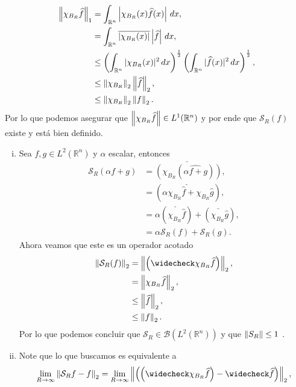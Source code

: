 \begin{homeworkProblem}
\begin{solution}
\begin{note}{}
      \begin{align*}
        \left\|\chi_{B_{R}}\widehat{f}\right\|_{1}&=\int_{\mathbb{R}^{n}}\left| \chi_{B_{R}}(x)\widehat{f}(x) \right|\, dx,\\
        &=\int_{\mathbb{R}^{n}}\overline{\left| \chi_{B_{R}}(x) \right|}\left| \widehat{f} \right|\, dx,\\
        &\leq \left( \int_{\mathbb{R}^{n}}|\chi_{B_{R}}(x)|^2\, dx \right)^{\frac{1}{2}}\left( \int_{\mathbb{R}^{n}}|\widehat{f}(x)|^{2}\, dx \right)^{\frac{1}{2}},\\
        &\leq \left\|\chi_{B_{R}}\right\|_{2}\left\|\widehat{f}\right\|_{2},\\
        &\leq \left\|\chi_{B_{R}}\right\|_{2}\left\|f\right\|_{2}.
      \end{align*}
      Por lo que podemos asegurar que $\left\|\chi_{B_{R}}\widehat{f}\right\|\in L^1(\mathbb{R}^{n})$ y por ende que $\mathcal{S}_{R}(f)$ existe y está bien definido. 
    \end{note}
    \begin{enumerate}[(i)]
      \item Sea $f,g\in L^2(\mathbb{R}^{n})$ y $\alpha$ escalar, entonces
        \begin{align*}
          \mathcal{S}_{R}\left( \alpha f+g \right)&=\check{\left( \chi_{B_{R}}(\hat{\alpha f+g}) \right)},\\
          &= \left( \check{\alpha\chi_{B_{R}}\hat{f}+\chi_{B_{R}}\hat{g}} \right),\\
          &=\alpha \left( \check{\chi_{B_{R}}\hat{f}} \right)+\left( \check{\chi_{B_{R}}\hat{g}} \right),\\
          &=\alpha \mathcal{S}_{R}(f)+\mathcal{S}_{R}(g).
        \end{align*}
        Ahora veamos que este es un operador acotado
        \begin{align*}
          \norm{\mathcal{S}_{R}(f)}_{2}&=\norm{\left( \check{\chi_{B_{R}}\hat{f}} \right)}_{2},\\
          &=\norm{\chi_{B_{R}}\hat{f}}_{2},\\
          &\leq\norm{\hat{f}}_{2},\\
          &\leq \norm{f}_{2}.
        \end{align*}
        Por lo que podemos concluir que $\mathcal{S}_{R}\in \mathcal{B}(L^2(\mathbb{R}^{n}))$ y que $\left\|S_{R}\right\|\leq 1$ .
      \item Note que lo que buscamos es equivalente a
        \begin{align*}
          \lim_{R \to \infty}\norm{\mathcal{S}_{R}f-f}_{2}&=\lim_{R \to \infty}\norm{\left( \left( \check{\chi_{B_{R}}\hat{f}} \right)-\check{\hat{f}} \right)}_{2},\\

\end{align*}
\end{enumerate}
\end{solution}
\end{homeworkProblem}

